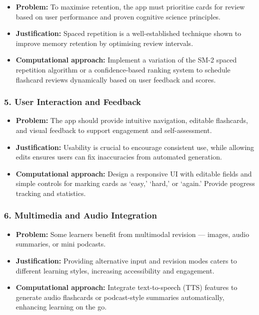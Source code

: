 \documentclass[a4paper,12pt]{article}
\begin{document}
\begin{itemize}
    \item \textbf{Problem:} To maximise retention, the app must prioritise cards for review based on user performance and proven cognitive science principles.
    \item \textbf{Justification:} Spaced repetition is a well-established technique shown to improve memory retention by optimising review intervals.
    \item \textbf{Computational approach:} Implement a variation of the SM-2 spaced repetition algorithm or a confidence-based ranking system to schedule flashcard reviews dynamically based on user feedback and scores.
\end{itemize}

\subsubsection*{5. User Interaction and Feedback}

\begin{itemize}
    \item \textbf{Problem:} The app should provide intuitive navigation, editable flashcards, and visual feedback to support engagement and self-assessment.
    \item \textbf{Justification:} Usability is crucial to encourage consistent use, while allowing edits ensures users can fix inaccuracies from automated generation.
    \item \textbf{Computational approach:} Design a responsive UI with editable fields and simple controls for marking cards as ‘easy,’ ‘hard,’ or ‘again.’ Provide progress tracking and statistics.
\end{itemize}

\subsubsection*{6. Multimedia and Audio Integration}

\begin{itemize}
    \item \textbf{Problem:} Some learners benefit from multimodal revision — images, audio summaries, or mini podcasts.
    \item \textbf{Justification:} Providing alternative input and revision modes caters to different learning styles, increasing accessibility and engagement.
    \item \textbf{Computational approach:} Integrate text-to-speech (TTS) features to generate audio flashcards or podcast-style summaries automatically, enhancing learning on the go.
\end{itemize}
\end{document}

